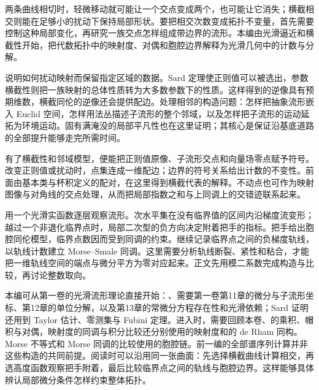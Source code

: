 
% 

\BookPartGuide
两条曲线相切时，轻微移动就可能让一个交点变成两个，也可能让它消失；横截相交则能在足够小的扰动下保持局部形状。要把相交次数变成拓扑不变量，首先需要控制这种局部变化，再研究一族交点怎样组成带边界的流形。本编由光滑逼近和横截性开始，把代数拓扑中的映射度、对偶和胞腔边界解释为光滑几何中的计数与分解。

\ProseParagraphBreak

说明如何扰动映射而保留指定区域的数据。Sard 定理使正则值可以被选出，参数横截性则把一族映射的总体性质转为大多数参数下的性质。这样得到的逆像具有预期维数，横截同伦的逆像还会提供配边。处理相邻的构造问题：怎样把抽象流形嵌入 Euclid 空间，怎样用法丛描述子流形的整个邻域，以及怎样把子流形的运动延拓为环境运动。固有满淹没的局部平凡性也在这里证明；其核心是保证沿基底道路的全部提升能够走完所需时间。

\ProseParagraphBreak

有了横截性和邻域模型，便能把正则值原像、子流形交点和向量场零点赋予符号。改变正则值或扰动时，点集连成一维配边；边界的符号关系给出计数的不变性。前面由基本类与杯积定义的配对，在这里得到横截代表的解释。不动点也可作为映射图像与对角线的交点处理，从而把局部指数之和与上同调上的交错迹联系起来。

\ProseParagraphBreak

用一个光滑实函数逐层观察流形。次水平集在没有临界值的区间内沿梯度流变形；越过一个非退化临界点时，局部二次型的负方向决定附着把手的指标。把手给出胞腔同伦模型，临界点数因而受到同调的约束。继续记录临界点之间的负梯度轨线，以轨线计数建立 Morse--Smale 同调。这里需要分析轨线断裂、紧性和粘合，才能把一维轨线空间的端点与微分平方为零对应起来。正文先用模二系数完成构造与比较，再讨论整数取向。

\ProseParagraphBreak

本编可从第一卷的光滑流形理论直接开始：、需要第一卷第11章的微分与子流形坐标、第12章的单位分解，以及第13章的常微分方程存在性和光滑依赖；Sard 证明还用到 Taylor 估计、零测集与 Fubini 定理。进入时，需要回顾本卷、的乘积、帽积与对偶，映射度的同调与积分比较还分别使用的映射度和的 de Rham 同构。Morse 不等式和 Morse 同调的比较使用的胞腔链。前一编的全部谱序列计算并非这些构造的共同前提。阅读时可以沿用同一张曲面：先选择横截曲线计算相交，再选高度函数观察把手附着，最后比较临界点之间的轨线与胞腔边界。这样能够具体辨认局部微分条件怎样约束整体拓扑。






